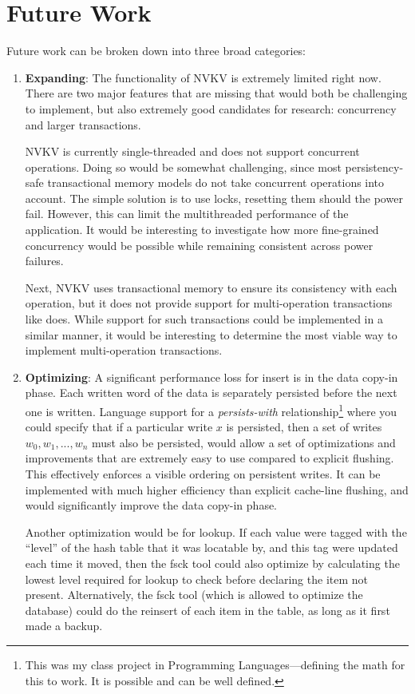 \section{Future Work}

Future work can be broken down into three broad categories:
\begin{enumerate}
\item \textbf{Expanding}: The functionality of NVKV is extremely limited right
now. There are two major features that are missing that would both be
challenging to implement, but also extremely good candidates for research:
concurrency and larger transactions.

NVKV is currently single-threaded and does not support concurrent operations.
Doing so would be somewhat challenging, since most persistency-safe
transactional memory models do not take concurrent operations into account. The
simple solution is to use locks, resetting them should the power fail. However,
this can limit the multithreaded performance of the application. It would be
interesting to investigate how more fine-grained concurrency would be possible
while remaining consistent across power failures.

Next, NVKV uses transactional memory to ensure its consistency with each
operation, but it does not
provide support for multi-operation transactions like \bdb does. While support
for such transactions could be implemented in a similar manner, it would be
interesting to determine the most viable way to implement multi-operation
transactions.

\item \textbf{Optimizing}: A significant performance loss for insert is in the
data copy-in phase. Each written word of the data is separately persisted before
the next one is written. Language support for a
\textit{persists-with} relationship\footnote{This was my class project in
Programming Languages---defining the math for this to work. It is possible and
can be well defined.} where you could specify that if a particular write $x$
is persisted, then a set of writes $w_0, w_1, ..., w_n$ must also be
persisted, would allow a set of optimizations and improvements that are
extremely easy to use compared to explicit flushing.
This effectively enforces a visible ordering on persistent writes. It can be
implemented with much higher efficiency than explicit cache-line flushing, and
would significantly improve the data copy-in phase.

Another optimization would be for lookup. If each value were tagged with the
``level'' of the hash table that it was locatable by, and this tag were updated
each time it moved, then the fsck tool could also optimize by calculating the
lowest level required for lookup to check before declaring the item not present.
Alternatively, the fsck tool (which is allowed to optimize the database) could
do the reinsert of each item in the table, as long as it first made a backup.


\end{enumerate}
